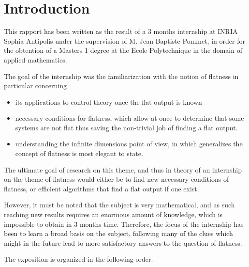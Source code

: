 \documentclass[12pt]{article}
\begin{document}
\newpage

\tableofcontents

\newpage

\section{Introduction}

This rapport has been written as the result of a 3 months internship at INRIA Sophia
Antipolis under the supervision of M. Jean Baptiste Pommet, in order for the obtention of a Masters 1 degree at the Ecole Polytechnique
in the domain of applied mathematics.

The goal of the internship was the familiarization with the notion of flatness in particular concerning

\begin{itemize}

  \item its applications to control theory once the flat output is known
  
  \item necessary conditions for flatness, which allow at once to determine
  that some systems are not flat thus saving the non-trivial job of finding
  a flat output.
  
  \item understanding the infinite dimensions point of view, in which generalizes
  the concept of flatness is most elegant to state.
  
\end{itemize}

The ultimate goal of research on this theme, and thus in theory of an internship on the theme of flatness
would either be to find new necessary conditions of flatness, or efficient algorithms that find a
flat output if one exist.

However, it must be noted that the subject is very mathematical, and as such reaching new results requires
an enormous amount of knowledge, which is impossible to obtain in 3 months time. Therefore, the focus of
the internship has been to learn a broad basis on the subject, following many of the clues which might in
the future lead to more satisfactory answers to the question of flatness.

The exposition is organized in the following order:
\end{document}
